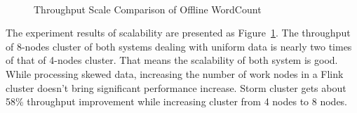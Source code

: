 \begin{figure}[t!]
\begin{center}
  ~
   \caption{Throughput Scale Comparison of Offline WordCount}
   \label{fig:offline_throughput_scale}
  \end{center}
\end{figure}

The experiment results of scalability are presented as Figure~\ref{fig:offline_throughput_scale}. The throughput of 8-nodes cluster of both systems dealing with uniform data is nearly two times of that of 4-nodes cluster. That means the scalability of both system is good. While processing skewed data, increasing the number of work nodes in a Flink cluster doesn't bring significant performance increase. Storm cluster gets about 58\% throughput improvement while increasing cluster from 4 nodes to 8 nodes.

